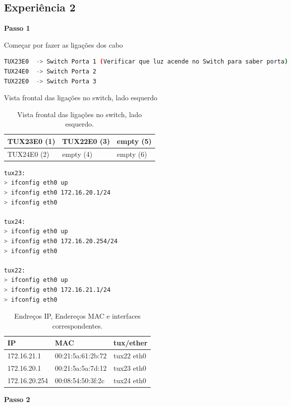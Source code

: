 \subsection{Experiência 2} \label{exp2_steps}

\textbf{Passo 1}

Começar por fazer as ligações dos cabo

\begin{lstlisting}[language=bash]
TUX23E0  -> Switch Porta 1 (Verificar que luz acende no Switch para saber porta)
TUX24E0  -> Switch Porta 2
TUX22E0  -> Switch Porta 3
\end{lstlisting}

Vista frontal das ligações no switch, lado esquerdo

\begin{table}[h]
\centering
\begin{tabular}{|l|l|l|}
\hline
TUX23E0 (1) & TUX22E0 (3) & empty (5) \\ \hline
TUX24E0 (2) & empty (4)   & empty (6) \\ \hline
\end{tabular}
\caption{\label{tab:table-name}Vista frontal das ligações no switch, lado esquerdo.}
\end{table}

\begin{lstlisting}[language=bash]
tux23:
> ifconfig eth0 up
> ifconfig eth0 172.16.20.1/24
> ifconfig eth0 

tux24:
> ifconfig eth0 up
> ifconfig eth0 172.16.20.254/24
> ifconfig eth0 

tux22:
> ifconfig eth0 up
> ifconfig eth0 172.16.21.1/24
> ifconfig eth0 
\end{lstlisting}


\begin{table}[h]
\centering
\begin{tabular}{|l|l|l|}
\hline
IP            & MAC               & tux/ether  \\ \hline
172.16.21.1   & 00:21:5a:61:2b:72 & tux22 eth0 \\ \hline
172.16.20.1   & 00:21:5a:5a:7d:12 & tux23 eth0 \\ \hline
172.16.20.254 & 00:08:54:50:3f:2c & tux24 eth0 \\ \hline
\end{tabular}
\caption{\label{tab:table-name}Endreços IP, Endereços MAC e interfaces correspondentes.}
\end{table}

\textbf{Passo 2}

